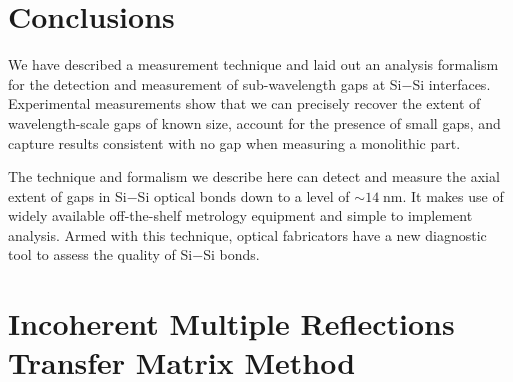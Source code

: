 \section{Conclusions}
We have described a measurement technique and laid out an analysis formalism for the detection and measurement of sub-wavelength gaps at Si$-$Si interfaces.  Experimental measurements show that we can precisely recover the extent of wavelength-scale gaps of known size, account for the presence of small gaps, and capture results consistent with no gap when measuring a monolithic part.

The technique and formalism we describe here can detect and measure the axial extent of gaps in Si$-$Si optical bonds down to a level of $\sim14\;$nm.  It makes use of widely available off-the-shelf metrology equipment and simple to implement analysis.  Armed with this technique, optical fabricators have a new diagnostic tool to assess the quality of Si$-$Si bonds.


\section{Incoherent Multiple Reflections Transfer Matrix Method}
\label{sec:Append-IMRTMM}

